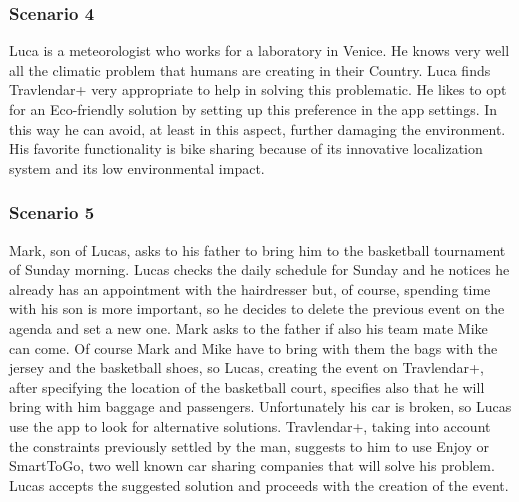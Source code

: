 	\subsubsection{Scenario 4}
	Luca is a meteorologist who works for a laboratory in Venice. He knows very well all the climatic problem that humans are creating in their Country. Luca finds Travlendar+ very appropriate to help in solving this problematic. He likes to opt for an Eco-friendly solution by setting up this preference in the app settings. In this way he can avoid, at least in this aspect, further damaging the environment. His favorite functionality is bike sharing because of its innovative localization system and its low environmental impact.
	\subsubsection{Scenario 5}
		Mark, son of Lucas, asks to his father to bring him  to the basketball tournament of Sunday morning.\newline
		Lucas checks the daily schedule for Sunday and he notices he already has an appointment with the hairdresser but, of course, spending time with his son is more important, so he decides to delete the previous event on the agenda and set a new one.\newline
		Mark asks to the father if also his team mate Mike can come.
		Of course Mark and Mike have to bring with them the bags with the jersey and the basketball shoes, so Lucas, creating the event on Travlendar+, after specifying the location of the basketball court, specifies also that he will bring with him baggage and passengers.\newline
		Unfortunately his car is broken, so Lucas use  the app to look for alternative solutions.\newline
		Travlendar+, taking into account the constraints previously settled by the man, suggests to him to use Enjoy or SmartToGo, two well known car sharing companies that will solve his problem.\newline
		Lucas accepts the suggested solution and proceeds with the creation of the event.
